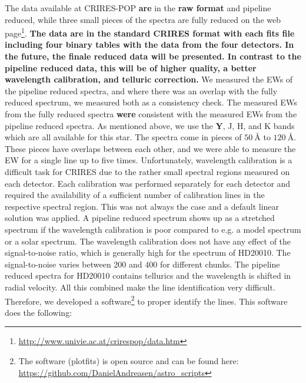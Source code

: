 \documentclass{aa}
\begin{document}
The data available at CRIRES-POP \textbf{are} in the \textbf{raw format} and pipeline
reduced, while three small pieces of the spectra are fully reduced on the web
page\footnote{\url{http://www.univie.ac.at/crirespop/data.htm}}. \textbf{The data
are in the standard CRIRES format with each fits file including four
binary tables with the data from the four detectors. In the future, the finale
reduced data will be presented. In contrast to the pipeline reduced data, this
will be of higher quality, a better wavelength calibration, and telluric correction.} We
measured the EWs of the pipeline reduced spectra, and where there was
an overlap with the fully reduced spectrum, we measured both as a
consistency check. The measured EWs from the fully reduced spectra \textbf{were}
consistent with the measured EWs from the pipeline reduced spectra. As
mentioned above, we use the \textbf{Y}, J, H, and K bands which are all available
for this star. The spectra come in pieces of $\SI{50}{\angstrom}$
to $\SI{120}{\angstrom}$. These pieces have overlaps between each
other, and we were able to measure the EW for a single line up to
five times. Unfortunately, wavelength calibration is a difficult task
for CRIRES due to the rather small spectral regions measured on each
detector. Each calibration was performed separately for each detector
and required the availability of a sufficient number of calibration
lines in the respective spectral region. This was not always the case
and a default linear solution was applied. A pipeline reduced spectrum
shows up as a stretched spectrum if the wavelength calibration is poor
compared to e.g. a model spectrum or a solar spectrum. The wavelength
calibration does not have any effect of the signal-to-noise ratio, which
is generally high for the spectrum of HD20010. The signal-to-noise
varies between 200 and 400 for different chunks. The pipeline reduced
spectra for HD20010 contains tellurics and the wavelength is shifted in
radial velocity. All this combined make the line identification very
difficult. Therefore, we developed a software\footnote{The software
(plot\textunderscore{}fits) is open source and can be found here:
\url{https://github.com/DanielAndreasen/astro_scripts}} to proper
identify the lines. This software does the following:
\end{document}
